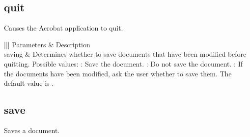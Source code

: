 \documentclass[letterpaper,12pt,english,openany,oneside]{sphinxmanual}
\begin{document}
\subsection{quit}
\label{\detokenize{IAC_API_AppleEvtObjects:quit-1}}\label{\detokenize{IAC_API_AppleEvtObjects:id2}}
Causes the Acrobat application to quit.

\label{\detokenize{IAC_API_AppleEvtObjects:syntax-10}}

\begin{sphinxVerbatim}[commandchars=\\\{\}]
  \PYG{p}{[}\PYG{p}{]}
\end{sphinxVerbatim}
\label{\detokenize{IAC_API_AppleEvtObjects:parameters-10}}


\begin{savenotes}\sphinxattablestart
\centering
{}\label{\detokenize{IAC_API_AppleEvtObjects:section-25}}\nobreak
\begin{tabular}[t]{|||}
\hline
\sphinxstyletheadfamily 
Parameters
&\sphinxstyletheadfamily 
Description
\\
\hline
saving
&
Determines whether to save documents that have been modified before quitting. Possible values:  : Save the document.  : Do not save the document.  : If the documents have been modified, ask the user whether to save them.  The default value is .
\\
\hline
\end{tabular}
\par
\sphinxattableend\end{savenotes}
\label{\detokenize{IAC_API_AppleEvtObjects:applescript-example-6}}

\begin{sphinxVerbatim}[commandchars=\\\{\}]
  
\end{sphinxVerbatim}




\subsection{save}
\label{\detokenize{IAC_API_AppleEvtObjects:save}}
Saves a document.
\end{document}
